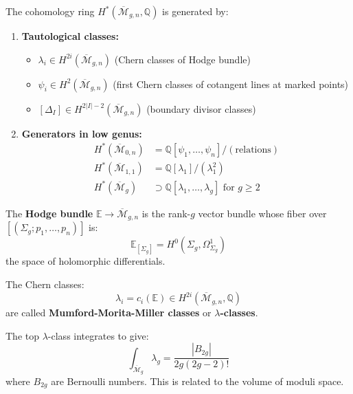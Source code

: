 \begin{theorem}
\label{thm:mmm-classes}
The cohomology ring $H^*(\overline{\mathcal{M}}_{g,n}, \mathbb{Q})$ is generated by:
\begin{enumerate}
\item \textbf{Tautological classes:}
\begin{itemize}
\item $\lambda_i \in H^{2i}(\overline{\mathcal{M}}_{g,n})$ (Chern classes of Hodge bundle)
\item $\psi_i \in H^2(\overline{\mathcal{M}}_{g,n})$ (first Chern classes of cotangent lines at marked points)
\item $[\Delta_I] \in H^{2|I|-2}(\overline{\mathcal{M}}_{g,n})$ (boundary divisor classes)
\end{itemize}

\item \textbf{Generators in low genus:}
\begin{align}
H^*(\overline{\mathcal{M}}_{0,n}) &= \mathbb{Q}[\psi_1, \ldots, \psi_n] / (\text{relations})\\
H^*(\overline{\mathcal{M}}_{1,1}) &= \mathbb{Q}[\lambda_1] / (\lambda_1^2)\\
H^*(\overline{\mathcal{M}}_g) &\supset \mathbb{Q}[\lambda_1, \ldots, \lambda_g] \text{ for } g \geq 2
\end{align}
\end{enumerate}
\end{theorem}

\begin{definition}
\label{def:hodge-bundle}
The \textbf{Hodge bundle} $\mathbb{E} \to \overline{\mathcal{M}}_{g,n}$ is the rank-$g$ vector bundle whose fiber over $[(\Sigma_g; p_1, \ldots, p_n)]$ is:
\begin{equation}
\mathbb{E}_{[\Sigma_g]} = H^0(\Sigma_g, \Omega^1_{\Sigma_g})
\end{equation}
the space of holomorphic differentials.

The Chern classes:
\begin{equation}
\lambda_i = c_i(\mathbb{E}) \in H^{2i}(\overline{\mathcal{M}}_{g,n}, \mathbb{Q})
\end{equation}
are called \textbf{Mumford-Morita-Miller classes} or \textbf{$\lambda$-classes}.
\end{definition}

\begin{theorem}
\label{thm:mumford-formula}
The top $\lambda$-class integrates to give:
\begin{equation}
\int_{\overline{\mathcal{M}}_g} \lambda_g = \frac{|B_{2g}|}{2g(2g-2)!}
\end{equation}
where $B_{2g}$ are Bernoulli numbers. This is related to the volume of moduli space.
\end{theorem}

